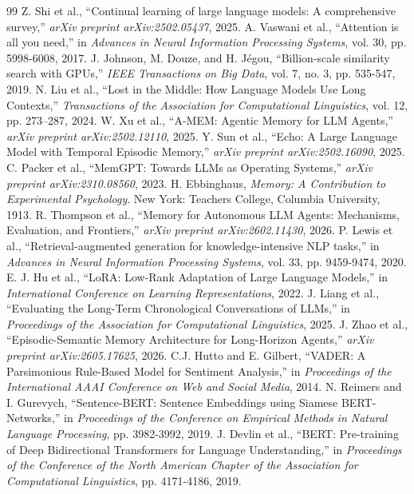 \documentclass[conference]{IEEEtran}
\begin{document}
\begin{thebibliography}{99}
 Z. Shi et al., ``Continual learning of large language models: A comprehensive survey,'' \textit{arXiv preprint arXiv:2502.05437}, 2025.
 A. Vaswani et al., ``Attention is all you need,'' in \textit{Advances in Neural Information Processing Systems}, vol. 30, pp. 5998-6008, 2017.
 J. Johnson, M. Douze, and H. Jégou, ``Billion-scale similarity search with GPUs,'' \textit{IEEE Transactions on Big Data}, vol. 7, no. 3, pp. 535-547, 2019.
 N. Liu et al., ``Lost in the Middle: How Language Models Use Long Contexts,'' \textit{Transactions of the Association for Computational Linguistics}, vol. 12, pp. 273–287, 2024.
 W. Xu et al., ``A-MEM: Agentic Memory for LLM Agents,'' \textit{arXiv preprint arXiv:2502.12110}, 2025.
 Y. Sun et al., ``Echo: A Large Language Model with Temporal Episodic Memory,'' \textit{arXiv preprint arXiv:2502.16090}, 2025.
 C. Packer et al., ``MemGPT: Towards LLMs as Operating Systems,'' \textit{arXiv preprint arXiv:2310.08560}, 2023.
 H. Ebbinghaus, \textit{Memory: A Contribution to Experimental Psychology}. New York: Teachers College, Columbia University, 1913.
 R. Thompson et al., ``Memory for Autonomous LLM Agents: Mechanisms, Evaluation, and Frontiers,'' \textit{arXiv preprint arXiv:2602.11430}, 2026.
 P. Lewis et al., ``Retrieval-augmented generation for knowledge-intensive NLP tasks,'' in \textit{Advances in Neural Information Processing Systems}, vol. 33, pp. 9459-9474, 2020.
 E. J. Hu et al., ``LoRA: Low-Rank Adaptation of Large Language Models,'' in \textit{International Conference on Learning Representations}, 2022.
 J. Liang et al., ``Evaluating the Long-Term Chronological Conversations of LLMs,'' in \textit{Proceedings of the Association for Computational Linguistics}, 2025.
 J. Zhao et al., ``Episodic-Semantic Memory Architecture for Long-Horizon Agents,'' \textit{arXiv preprint arXiv:2605.17625}, 2026.
 C.J. Hutto and E. Gilbert, ``VADER: A Parsimonious Rule-Based Model for Sentiment Analysis,'' in \textit{Proceedings of the International AAAI Conference on Web and Social Media}, 2014.
 N. Reimers and I. Gurevych, ``Sentence-BERT: Sentence Embeddings using Siamese BERT-Networks,'' in \textit{Proceedings of the Conference on Empirical Methods in Natural Language Processing}, pp. 3982-3992, 2019.
 J. Devlin et al., ``BERT: Pre-training of Deep Bidirectional Transformers for Language Understanding,'' in \textit{Proceedings of the Conference of the North American Chapter of the Association for Computational Linguistics}, pp. 4171-4186, 2019.

\end{thebibliography}
\end{document}
